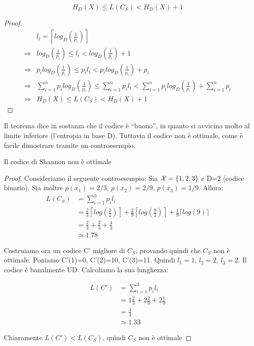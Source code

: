 \begin{teorema}
\[
 H_D(X) \le L(C_S) < H_D(X)+1
\]
\begin{proof}
\[\begin{split}
 & l_i=\left \lceil log_D \left (\frac{1}{p_i} \right) \right \rceil \\
 \Rightarrow & log_D \left ( \frac{1}{p_i} \right ) \le l_i < log_D \left ( \frac{1}{p_i} \right ) + 1 \\
 \Rightarrow & p_i log_D \left ( \frac{1}{p_i} \right ) \le p_i l_i < p_i log_D \left ( \frac{1}{p_i} \right ) + p_i \\ 
 \Rightarrow & \sum_{i=1}^n p_i log_D \left ( \frac{1}{p_i} \right ) \le \sum_{i=1}^n  p_i l_i 
                < \sum_{i=1}^n  p_i log_D \left ( \frac{1}{p_i} \right ) + \sum_{i=1}^n p_i \\ 
 \Rightarrow & H_D(X) \le L(C_S) < H_D(X)+1
 \end{split}
\]
\end{proof}
\label{codiceshannon}
\end{teorema}

Il teorema dice in sostanza che il codice è ``buono'', in quanto si avvicina molto al limite inferiore (l'entropia in base D).
Tuttavia il codice non è ottimale, come è facile dimostrare tramite un controesempio.

\begin{proposizione}
 Il codice di Shannon non è ottimale
\begin{proof}
 Consideriamo il seguente controesempio: Sia $\mathcal{X}=\{1,2,3\}$ e D=2 (codice binario). Sia inoltre 
 $p(x_1)=2/3$, $p(x_2)=2/9$, $p(x_3)=1/9$.
 Allora:
\[\begin{split}
 L(C_S) &= \sum_{i=1}^3 p_i l_i \\
        &= \frac{2}{3} \left \lceil log \left (\frac{3}{2} \right) \right \rceil + 
           \frac{2}{9} \left \lceil  log \left (\frac{9}{2} \right) \right  \rceil +
           \frac{1}{9} \biggl \lceil log \left (9            \right) \biggr \rceil \\
        &= \frac{2}{3} + \frac{2}{3} + \frac{4}{3} \\
        & \simeq 1.78 
  \end{split}
\]
 
 Costruiamo ora un codice C' migliore di $C_S$, provando quindi che $C_S$ non è ottimale.
 Poniamo C'(1)=0, C'(2)=10, C'(3)=11. Quindi $l_1=1$, $l_2=2$, $l_3=2$. Il codice è banalmente UD.
 Calcoliamo la sua lunghezza:

\[\begin{split}
 L(C') &= \sum_{i=1}^3 p_i l_i \\
        &= 1 \frac{2}{3} + 
           2 \frac{2}{9} +
           2 \frac{1}{9} \\
        &= \frac{4}{3}\\
        & \simeq 1.33
  \end{split}
\]

Chiaramente $L(C') < L(C_S)$, quindi $C_S$ non è ottimale

\end{proof}
\end{proposizione}

